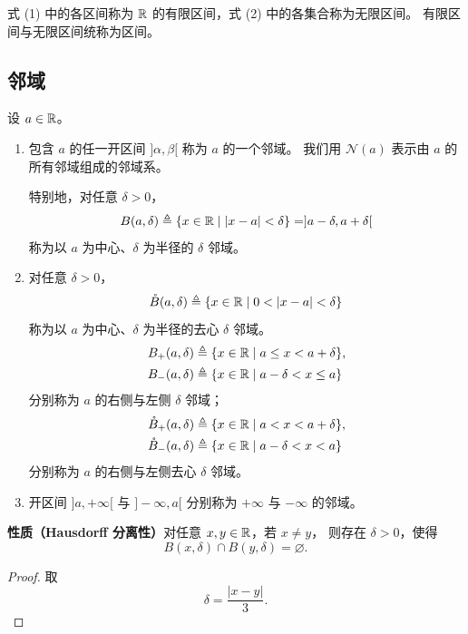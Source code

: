 式 (1) 中的各区间称为 \(\mathbb{R}\) 的有限区间，式 (2) 中的各集合称为无限区间。
有限区间与无限区间统称为区间。

\subsection{邻域}
	\label{sec:2-5-3}

\begin{mydef*}{}
设 \(a\in\mathbb{R}\)。
\begin{enumerate}[label=\arabic*)]
  \item 包含 \(a\) 的任一开区间 \(]\alpha,\beta[\) 称为 \(a\) 的一个邻域。
  我们用 \(\mathcal N(a)\) 表示由 \(a\) 的所有邻域组成的邻域系。

  特别地，对任意 \(\delta>0\)，
  \[
  B(a,\delta)\mathrel{\triangleq}
  \{x\in\mathbb{R}\mid |x-a|<\delta\}
  =]a-\delta,a+\delta[
  \]
  称为以 \(a\) 为中心、\(\delta\) 为半径的 \(\delta\) 邻域。

  \item 对任意 \(\delta>0\)，
  \[
  \mathring B(a,\delta)\mathrel{\triangleq}
  \{x\in\R\mid 0<|x-a|<\delta\}
  \]
  称为以 \(a\) 为中心、\(\delta\) 为半径的去心 \(\delta\) 邻域。
  \[
  \begin{aligned}
  B_+(a,\delta)&\mathrel{\triangleq}\{x\in\mathbb{R}\mid a\leq x<a+\delta\},\\
  B_-(a,\delta)&\mathrel{\triangleq}\{x\in\mathbb{R}\mid a-\delta<x\leq a\}
  \end{aligned}
  \]
  分别称为 \(a\) 的右侧与左侧 \(\delta\) 邻域；
  \[
  \begin{aligned}
  \mathring B_+(a,\delta)&\mathrel{\triangleq}
  \{x\in\mathbb{R}\mid a<x<a+\delta\},\\
  \mathring B_-(a,\delta)&\mathrel{\triangleq}
  \{x\in\mathbb{R}\mid a-\delta<x<a\}
  \end{aligned}
  \]
  分别称为 \(a\) 的右侧与左侧去心 \(\delta\) 邻域。

  \item 开区间 \(]a,+\infty[\) 与 \(]-\infty,a[\) 分别称为 \(+\infty\)
  与 \(-\infty\) 的邻域。
\end{enumerate}
\end{mydef*}

\textbf{性质（Hausdorff 分离性）}\quad 对任意 \(x,y\in\mathbb{R}\)，若 \(x\neq y\)，
则存在 \(\delta>0\)，使得
\[
B(x,\delta)\cap B(y,\delta)=\varnothing.
\]

\begin{proof}
取
\[
\delta=\frac{|x-y|}{3}.
\]
\end{proof}

